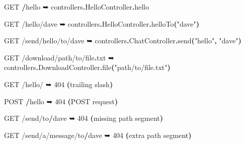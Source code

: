 \documentclass[oneside,11pt,a4paper,]{book}
\newenvironment{Shaded}{\begin{snugshade}}{\end{snugshade}}
\newcommand{\KeywordTok}[1]{\textcolor[rgb]{0.13,0.29,0.53}{\textbf{{#1}}}}
\newcommand{\DecValTok}[1]{\textcolor[rgb]{0.00,0.00,0.81}{{#1}}}
\newcommand{\StringTok}[1]{\textcolor[rgb]{0.31,0.60,0.02}{{#1}}}
\newcommand{\NormalTok}[1]{{#1}}
\begin{document}
\begin{Shaded}
\begin{Highlighting}[]
\NormalTok{GET }\KeywordTok{/}\NormalTok{hello}
  \NormalTok{➥ controllers}\KeywordTok{.}\NormalTok{HelloController}\KeywordTok{.}\NormalTok{hello}

\NormalTok{GET }\StringTok{/hello/}\NormalTok{dave}
  \NormalTok{➥ controllers}\KeywordTok{.}\NormalTok{HelloController}\KeywordTok{.}\NormalTok{helloTo}\KeywordTok{(}\StringTok{"dave"}\KeywordTok{)}

\NormalTok{GET }\StringTok{/send/}\NormalTok{hello}\StringTok{/to/}\NormalTok{dave}
  \NormalTok{➥ controllers}\KeywordTok{.}\NormalTok{ChatController}\KeywordTok{.}\NormalTok{send}\KeywordTok{(}\StringTok{"hello"}\KeywordTok{,} \StringTok{"dave"}\KeywordTok{)}

\NormalTok{GET }\StringTok{/download/}\NormalTok{path}\StringTok{/to/}\NormalTok{file}\KeywordTok{.}\NormalTok{txt}
  \NormalTok{➥ controllers}\KeywordTok{.}\NormalTok{DownloadController}\KeywordTok{.}\NormalTok{file}\KeywordTok{(}\StringTok{"path/to/file.txt"}\KeywordTok{)}

\NormalTok{GET }\StringTok{/hello/}
  \NormalTok{➥ }\DecValTok{404} \KeywordTok{(}\NormalTok{trailing slash}\KeywordTok{)}

\NormalTok{POST }\KeywordTok{/}\NormalTok{hello}
  \NormalTok{➥ }\DecValTok{404} \KeywordTok{(}\NormalTok{POST request}\KeywordTok{)}

\NormalTok{GET }\StringTok{/send/}\NormalTok{to}\KeywordTok{/}\NormalTok{dave}
  \NormalTok{➥ }\DecValTok{404} \KeywordTok{(}\NormalTok{missing path segment}\KeywordTok{)}

\NormalTok{GET }\StringTok{/send/}\NormalTok{a}\StringTok{/message/}\NormalTok{to}\KeywordTok{/}\NormalTok{dave}
  \NormalTok{➥ }\DecValTok{404} \KeywordTok{(}\NormalTok{extra path segment}\KeywordTok{)}
\end{Highlighting}
\end{Shaded}
\end{document}
